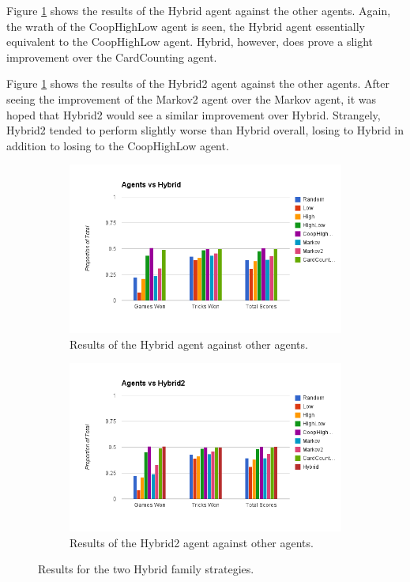 Figure \ref{fig:results_hybrid} shows the results of the Hybrid agent against the other agents. Again, the wrath of the CoopHighLow agent
is seen, the Hybrid agent essentially equivalent to the CoopHighLow agent. Hybrid, however, does prove a slight improvement over the CardCounting
agent.

Figure \ref{fig:results_hybrid} shows the results of the Hybrid2 agent against the other agents. After seeing the improvement of the Markov2
agent over the Markov agent, it was hoped that Hybrid2 would see a similar improvement over Hybrid. Strangely, Hybrid2 tended to perform slightly
worse than Hybrid overall, losing to Hybrid in addition to losing to the CoopHighLow agent.

\begin{figure}[ht]
    \begin{subfigure}[b]{0.5\textwidth}
        \centering
        \includegraphics[width=\textwidth]{data/hybrid.png}
    \caption{Results of the Hybrid agent against other agents.}
    \label{fig:results_hybrid}
    \end{subfigure}
    \begin{subfigure}[b]{0.5\textwidth}
        \centering
        \includegraphics[width=\textwidth]{data/hybrid2.png}
    \caption{Results of the Hybrid2 agent against other agents.}
    \label{fig:results_hybrid2}
    \end{subfigure}
    \caption{Results for the two Hybrid family strategies.}
\end{figure}




